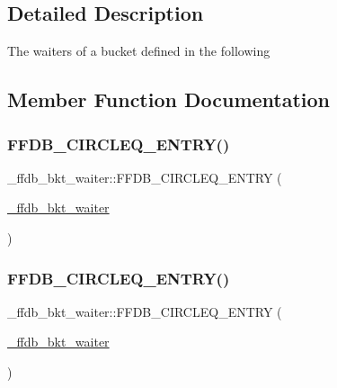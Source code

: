 \subsection{Detailed Description}
The waiters of a bucket defined in the following 

\subsection{Member Function Documentation}
\mbox{\label{struct__ffdb__bkt__waiter_a46ff621e44918a826d983ac183c59c5c}} 
\subsubsection{\texorpdfstring{FFDB\_CIRCLEQ\_ENTRY()}{FFDB\_CIRCLEQ\_ENTRY()}\hspace{0.1cm}{\footnotesize\ttfamily [1/2]}}
{\footnotesize\ttfamily \+\_\+ffdb\+\_\+bkt\+\_\+waiter\+::\+F\+F\+D\+B\+\_\+\+C\+I\+R\+C\+L\+E\+Q\+\_\+\+E\+N\+T\+RY (\begin{DoxyParamCaption}\item[{\mbox{\hyperlink{struct__ffdb__bkt__waiter}{\+\_\+ffdb\+\_\+bkt\+\_\+waiter}}}]{ }\end{DoxyParamCaption})}

\mbox{\label{struct__ffdb__bkt__waiter_a46ff621e44918a826d983ac183c59c5c}} 
\subsubsection{\texorpdfstring{FFDB\_CIRCLEQ\_ENTRY()}{FFDB\_CIRCLEQ\_ENTRY()}\hspace{0.1cm}{\footnotesize\ttfamily [2/2]}}
{\footnotesize\ttfamily \+\_\+ffdb\+\_\+bkt\+\_\+waiter\+::\+F\+F\+D\+B\+\_\+\+C\+I\+R\+C\+L\+E\+Q\+\_\+\+E\+N\+T\+RY (\begin{DoxyParamCaption}\item[{\mbox{\hyperlink{struct__ffdb__bkt__waiter}{\+\_\+ffdb\+\_\+bkt\+\_\+waiter}}}]{ }\end{DoxyParamCaption})}



